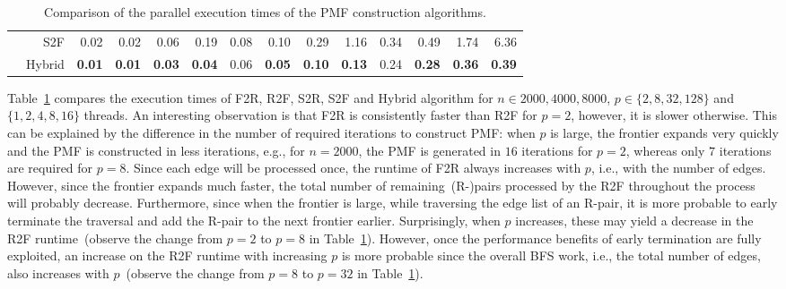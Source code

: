 \documentclass[12pt]{article}
\begin{document}
\begin{table}[ht]
\begin{spacing}{1.2}
{\begin{tabular}{rr|rrrr|rrrr|rrrr}
				& S2F & 0.02 & 0.02 & 0.06 & 0.19 & 0.08 & 0.10 & 0.29 & 1.16 & 0.34 & 0.49 & 1.74 & 6.36 \\
		
				& Hybrid & \textbf{0.01} & \textbf{0.01} & \textbf{0.03} & \textbf{0.04} & 0.06 & \textbf{0.05} & \textbf{0.10} & \textbf{0.13} & 0.24 & \textbf{0.28} & \textbf{0.36} & \textbf{0.39}
			\end{tabular}
		}
	\end{spacing}
	\caption{Comparison of the parallel execution times of the PMF construction algorithms.}
	\label{table:PMF_time}
\end{table}
\setlength{\tabcolsep}{6pt}


Table~\ref{table:PMF_time} compares the execution times of F2R, R2F, S2R, S2F and Hybrid algorithm for $n \in {2000, 4000, 8000}$, $p \in \{2, 8, 32, 128\}$ and $\{1, 2, 4, 8, 16\}$ threads. An interesting observation is that F2R is consistently faster than R2F for $p = 2$, however, it is slower otherwise. This can be explained by the difference in the number of required iterations to construct PMF: when $p$ is large, the frontier expands very quickly and the PMF is constructed in less iterations, e.g., for $n = 2000$, the PMF is generated in $16$ iterations for $p = 2$, whereas only $7$ iterations are required for $p = 8$. Since each edge will be processed once, the runtime of F2R always increases with $p$, i.e., with the number of edges. However, since the frontier expands much faster, the total number of remaining~(R-)pairs processed by the R2F throughout the process will probably decrease. Furthermore, since when the frontier is large, while traversing the edge list of an R-pair, it is more probable to early terminate the traversal and add the R-pair to the next frontier earlier. Surprisingly,  when $p$ increases, these may yield a decrease in the R2F runtime~(observe the change from $p = 2$ to $p = 8$ in Table~\ref{table:PMF_time}). However, once the performance benefits of early termination are fully exploited, an increase on the R2F runtime with increasing $p$ is more probable since the overall BFS work, i.e., the total number of edges, also increases with $p$~(observe the change from $p = 8$ to $p = 32$ in Table~\ref{table:PMF_time}).
\end{document}
